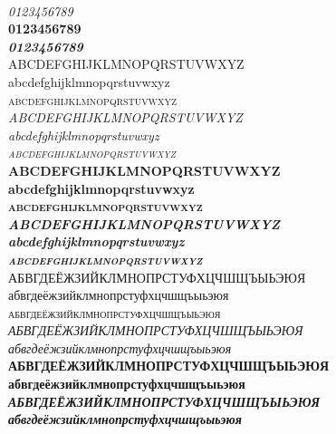 \documentclass[10pt]{lecturenotes}
\begin{document}
\begin{sloppypar}
\begin{figure}[ht]
{\Huge{}}
{\Huge{}}

\begin{minipage}[b]{0.45\linewidth}
\\
\textit{0123456789}\\
\textbf{0123456789}\\
\textbf{\textit{0123456789}}\\

\noindent
ABCDEFGHIJKLMNOPQRSTUVWXYZ\\
abcdefghijklmnopqrstuvwxyz\\
\textsc{abcdefghijklmnopqrstuvwxyz}\\
\textit{ABCDEFGHIJKLMNOPQRSTUVWXYZ\\
abcdefghijklmnopqrstuvwxyz\\
\textsc{abcdefghijklmnopqrstuvwxyz}}\\
\textbf{ABCDEFGHIJKLMNOPQRSTUVWXYZ\\
abcdefghijklmnopqrstuvwxyz\\
\textsc{abcdefghijklmnopqrstuvwxyz}}\\
\textbf{\textit{ABCDEFGHIJKLMNOPQRSTUVWXYZ\\
abcdefghijklmnopqrstuvwxyz\\
\textsc{abcdefghijklmnopqrstuvwxyz}}}\\

\noindent
АБВГДЕЁЖЗИЙКЛМНОПРСТУФХЦЧШЩЪЫЬЭЮЯ \\
абвгдеёжзийклмнопрстуфхцчшщъыьэюя \\
\textsc{абвгдеёжзийклмнопрстуфхцчшщъыьэюя}\\
\textit{АБВГДЕЁЖЗИЙКЛМНОПРСТУФХЦЧШЩЪЫЬЭЮЯ\\
абвгдеёжзийклмнопрстуфхцчшщъыьэюя }\\
\textbf{АБВГДЕЁЖЗИЙКЛМНОПРСТУФХЦЧШЩЪЫЬЭЮЯ \\
абвгдеёжзийклмнопрстуфхцчшщъыьэюя }\\
\textbf{\textit{АБВГДЕЁЖЗИЙКЛМНОПРСТУФХЦЧШЩЪЫЬЭЮЯ \\
абвгдеёжзийклмнопрстуфхцчшщъыьэюя }}\\



\end{minipage}
\end{figure}
\end{sloppypar}
\end{document}
